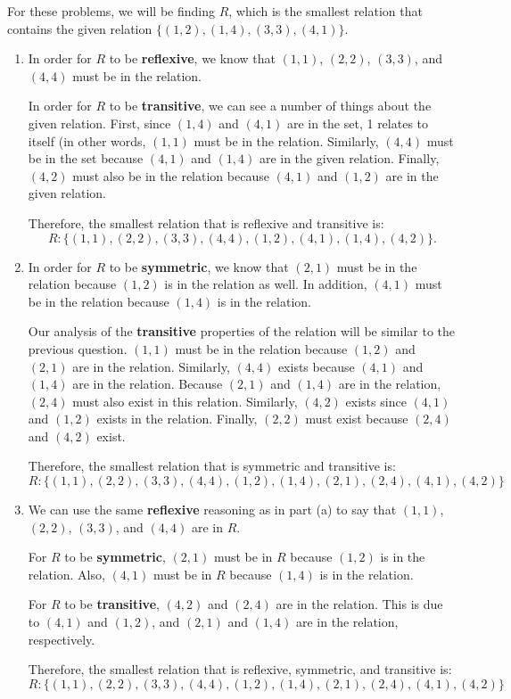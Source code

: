 \documentclass[letterpaper, 12pt]{article}
\begin{document}
For these problems, we will be finding $R$, which is the smallest relation that contains the given relation $\{(1, 2),(1, 4),(3, 3),(4, 1)\}$.
\begin{enumerate}
    \item In order for $R$ to be \textbf{reflexive}, we know that $(1,1)$, $(2,2)$, $(3,3)$, and $(4,4)$ must be in the relation.
    
    In order for $R$ to be \textbf{transitive}, we can see a number of things about the given relation. First, since $(1,4)$ and $(4,1)$ are in the set, 1 relates to itself (in other words, $(1,1)$ must be in the relation. Similarly, $(4,4)$ must be in the set because $(4,1)$ and $(1,4)$ are in the given relation. Finally, $(4,2)$ must also be in the relation because $(4,1)$ and $(1,2)$ are in the given relation.
    
    Therefore, the smallest relation that is reflexive and transitive is:
    \[R: \{(1,1), (2,2), (3,3), (4,4), (1,2), (4,1), (1,4), (4,2)\}.\]
    
    \item In order for $R$ to be \textbf{symmetric}, we know that $(2,1)$ must be in the relation because $(1,2)$ is in the relation as well. In addition, $(4,1)$ must be in the relation because $(1,4)$ is in the relation.
    
    Our analysis of the \textbf{transitive} properties of the relation will be similar to the previous question. $(1,1)$ must be in the relation because $(1,2)$ and $(2,1)$ are in the relation. Similarly, $(4,4)$ exists because $(4,1)$ and $(1,4)$ are in the relation. Because $(2,1)$ and $(1,4)$ are in the relation, $(2,4)$ must also exist in this relation. Similarly, $(4,2)$ exists since $(4,1)$ and $(1,2)$ exists in the relation. Finally, $(2,2)$ must exist because $(2,4)$ and $(4,2)$ exist.
    
    Therefore, the smallest relation that is symmetric and transitive is:
    \[R: \{(1,1), (2,2), (3,3), (4,4), (1,2), (1,4), (2,1), (2,4), (4,1), (4,2)\}\]
    
    \item We can use the same \textbf{reflexive} reasoning as in part (a) to say that $(1,1)$, $(2,2)$, $(3,3)$, and $(4,4)$ are in $R$.
    
    For $R$ to be \textbf{symmetric}, $(2,1)$ must be in $R$ because $(1,2)$ is in the relation. Also, $(4,1)$ must be in $R$ because $(1,4)$ is in the relation.
    
    For $R$ to be \textbf{transitive}, $(4,2)$ and $(2,4)$ are in the relation. This is due to $(4,1)$ and $(1,2)$, and $(2,1)$ and $(1,4)$ are in the relation, respectively.
    
    Therefore, the smallest relation that is reflexive, symmetric, and transitive is:
    \[R: \{(1,1), (2,2), (3,3), (4,4), (1,2), (1,4), (2,1), (2,4), (4,1), (4,2)\}\]
\end{enumerate}
\end{document}
